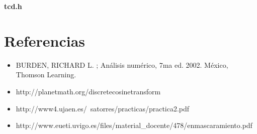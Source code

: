 \documentclass[10pt, a4paper]{article}
\begin{document}
\centerline{\large{\textbf{tcd.h}}}


\section{Referencias}


\begin{itemize}

\item BURDEN, RICHARD L. ; An\'alisis num\'erico, 7ma ed. 2002. M\'exico, Thomson Learning.

\item {http://planetmath.org/discretecosinetransform}

\item http://www4.ujaen.es/~satorres/practicas/practica2.pdf

\item http://www.eueti.uvigo.es/files/material\_docente/478/enmascaramiento.pdf

\end{itemize}
\end{document}
